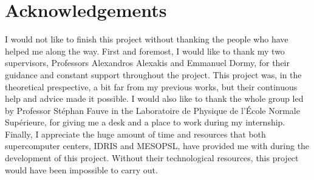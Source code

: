 \documentclass[../main.tex]{subfiles}
\begin{document}
\section*{Acknowledgements}
I would not like to finish this project without thanking the people who have helped me along the way. First and foremost, I would like to thank my two supervisors, Professors Alexandros Alexakis and Emmanuel Dormy, for their guidance and constant support throughout the project. This project was, in the theoretical prespective, a bit far from my previous works, but their continuous help and advice made it possible. I would also like to thank the whole group led by Professor Stéphan Fauve in the Laboratoire de Physique de l'École Normale Supérieure, for giving me a desk and a place to work during my internship. Finally, I appreciate the huge amount of time and resources that both supercomputer centers, IDRIS and MESOPSL, have provided me with during the development of this project. Without their technological resources, this project would have been impossible to carry out.
\end{document}
